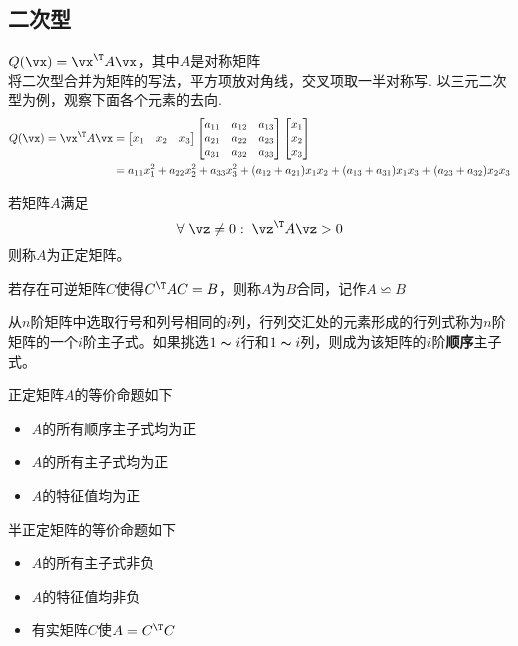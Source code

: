 \subsection{二次型}
\begin{definition}[二次型]
$Q(\vx)=\vx^\T A\vx$，其中$A$是对称矩阵\\
将二次型合并为矩阵的写法，平方项放对角线，交叉项取一半对称写. 以三元二次型为例，观察下面各个元素的去向.
\[\begin{aligned}Q(\vx)=\vx^\T A\vx&=\begin{bmatrix}x_1&x_2&x_3\end{bmatrix}\begin{bmatrix}a_{11}&a_{12}&a_{13}\\a_{21}&a_{22}&a_{23}\\a_{31}&a_{32}&a_{33}\end{bmatrix}\begin{bmatrix}x_1\\x_2\\x_3\end{bmatrix}\\
&=a_{11}x_1^2+a_{22}x_2^2+a_{33}x_3^2+(a_{12}+a_{21})x_1x_2+(a_{13}+a_{31})x_1x_3+(a_{23}+a_{32})x_2x_3\end{aligned}\]
\end{definition}
\begin{definition}
若矩阵$A$满足
\[\forall\;\vz\ne 0:\;\vz^\T A\vz>0\]
则称$A$为正定矩阵。
\end{definition}
\begin{definition}[合同(congruent)矩阵]
    若存在可逆矩阵$C$使得$C^\T AC=B$，则称$A$为$B$合同，记作$A\backsimeq B$
\end{definition}
\begin{definition}[主子式]
    从$n$阶矩阵中选取行号和列号相同的$i$列，行列交汇处的元素形成的行列式称为$n$阶矩阵的一个$i$阶主子式。如果挑选$1\thicksim i$行和$1\thicksim i$列，则成为该矩阵的$i$阶\textbf{顺序}主子式。
\end{definition}

正定矩阵$A$的等价命题如下
\begin{itemize}
    \item $A$的所有顺序主子式均为正
    \item $A$的所有主子式均为正
    \item $A$的特征值均为正
\end{itemize}

半正定矩阵的等价命题如下
\begin{itemize}
    \item $A$的所有主子式非负
    \item $A$的特征值均非负
    \item 有实矩阵$C$使$A=C^\T C$
\end{itemize}


